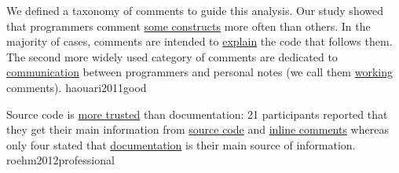 \documentclass{article}
\begin{document}

  {We defined a taxonomy of comments to guide this analysis. Our study showed that programmers comment \ul{some constructs} more often than others. In the majority of cases, comments are intended to \ul{explain} the code that follows them. The second more widely used category of comments are dedicated to \ul{communication} between programmers and personal notes (we call them \ul{working} comments).}
  {haouari2011good}



  {Source code is \ul{more trusted} than documentation: 21 participants reported that they get their main information from \ul{source code} and \ul{inline comments} whereas only four stated that \ul{documentation} is their main source of information.}
  {roehm2012professional}
\end{document}
